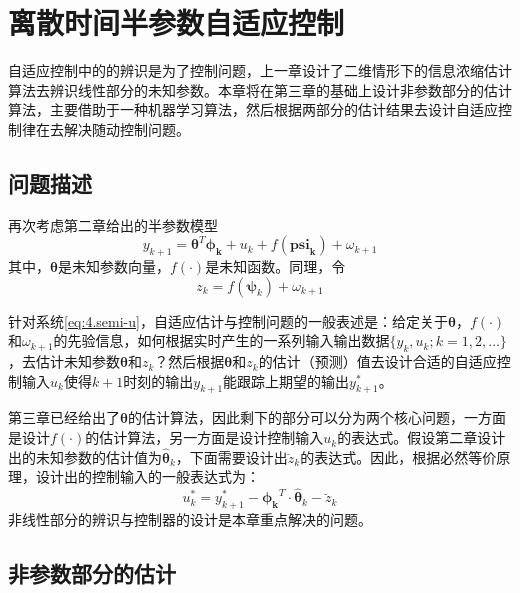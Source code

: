\chapter{离散时间半参数自适应控制}\label{chap:4}
自适应控制中的的辨识是为了控制问题，上一章设计了二维情形下的信息浓缩估计算法去辨识线性部分的未知参数。本章将在第三章的基础上设计非参数部分的估计算法，主要借助于一种机器学习算法，然后根据两部分的估计结果去设计自适应控制律在去解决随动控制问题。
\section{问题描述}\label{sect:4.1}
再次考虑第二章给出的半参数模型
\begin{equation}%
\label{eq:4.semi-u}
y_{k+1} = \bm{\theta}^{T}\bm{\phi_{k}}+u_{k}+f(\bm{\bm{psi}_{k}})+\omega_{k+1}
\end{equation}
其中，$\bm{\theta}$是未知参数向量，$f(\cdot)$是未知函数。同理，令
\begin{equation}
z_{k} = f(\bm{\psi}_{k}) + \omega_{k+1}
\end{equation}

针对系统\eqref{eq:4.semi-u}，自适应估计与控制问题的一般表述是：给定关于$\bm{\theta}$，$f(\cdot)$和$\omega_{k+1}$的先验信息，如何根据实时产生的一系列输入输出数据$\{y_{k},u_{k};k=1,2,\ldots\}$，去估计未知参数$\bm{\theta}$和$z_{k}$？然后根据$\bm{\theta}$和$z_{k}$的估计（预测）值去设计合适的自适应控制输入$u_{k}$使得$k+1$时刻的输出$y_{k+1}$能跟踪上期望的输出$y_{k+1}^{*}$。

第三章已经给出了$\bm{\theta}$的估计算法，因此剩下的部分可以分为两个核心问题，一方面是设计$f(\cdot)$的估计算法，另一方面是设计控制输入$u_{k}$的表达式。假设第二章设计出的未知参数的估计值为$\hat{\bm{\theta}}_{k}$，下面需要设计出$\breve{z}_{k}$的表达式。因此，根据必然等价原理，设计出的控制输入的一般表达式为：
\begin{equation}\label{eq:4.uk}
u_{k}^{*}=y_{k+1}^{*}-\bm{\phi_{k}}^{T}\cdot\hat{\bm{\theta}}_{k}-\breve{z}_{k}
\end{equation}
非线性部分的辨识与控制器的设计是本章重点解决的问题。

\section{非参数部分的估计}\label{sect:4.2}
